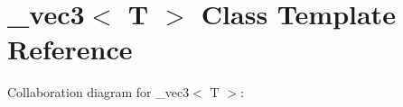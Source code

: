 \hypertarget{class__vec3}{}\section{\+\_\+vec3$<$ T $>$ Class Template Reference}
\label{class__vec3}


Collaboration diagram for \+\_\+vec3$<$ T $>$\+:
